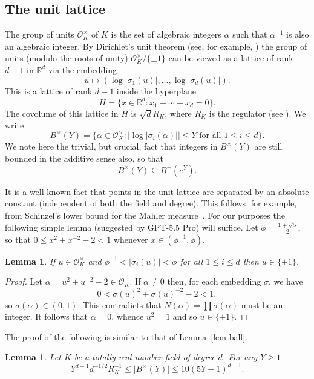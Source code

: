 \documentclass{amsart}
\numberwithin{equation}{section}
\newcommand{\abs}[1]{\mathopen{}\left| #1\mathclose{}\right|}
\newcommand{\bbr}{\mathbb{R}}
\newcommand{\Abs}[1]{\lvert #1\rvert}
\newtheorem{lemma}[theorem]{Lemma}
\begin{document}
\subsection{The unit lattice}
The group of units $\mathcal{O}_K^\times$ of $K$ is the set of algebraic integers $\alpha$ such that $\alpha^{-1}$ is also an algebraic integer. By Dirichlet's unit theorem (see, for example, \cite[Chapter 1.7]{Ne99}) the group of units (modulo the roots of unity) $\mathcal{O}_K^\times/\{\pm 1\}$ can be viewed as a lattice of rank $d-1$ in $\bbr^{d}$ via the embedding
\[u\mapsto (\log \abs{\sigma_1(u)},\ldots,\log \abs{\sigma_d(u)}).\]
This is a lattice of rank $d-1$ inside the hyperplane
\[H=\{ x\in \bbr^d : x_1+\cdots+x_d=0\}.\]
The covolume of this lattice in $H$ is $\sqrt{d}R_K$, where $R_K$ is the regulator (see \cite[Chapter 1, Proposition 7.5]{Ne99}). We write 
\[B^\times(Y) = \{ \alpha \in \mathcal{O}_K^\times : \abs{\log\abs{\sigma_i(\alpha)}}\leq Y\textrm{ for all }1\leq i\leq d\}.\]
We note here the trivial, but crucial, fact that integers in $B^\times(Y)$ are still bounded in the additive sense also, so that
\[B^\times(Y)\subseteq B^+(e^Y).\]

It is a well-known fact that points in the unit lattice are separated by an absolute constant (independent of both the field and degree). This follows, for example, from  Schinzel's lower bound for the Mahler measure~\cite[Theorem 2]{Schinzel1973}. For our purposes the following simple lemma (suggested by GPT-5.5 Pro) will suffice. Let $\phi=\frac{1+\sqrt{5}}{2}$, so that $0\leq x^2+x^{-2}-2<1$ whenever $x\in (\phi^{-1},\phi)$.
\begin{lemma}\label{lem-unitsep}
If $u\in \mathcal{O}_K^\times$ and $\phi^{-1}< \Abs{\sigma_i(u)}<\phi$ for all $1\leq i\leq d$ then $u\in\{\pm 1\}$. 
\end{lemma}
\begin{proof}
Let $\alpha=u^2+u^{-2}-2\in \mathcal{O}_K$. If $\alpha \neq 0$ then, for each embedding $\sigma$, we have
\[0<\sigma(u)^2+\sigma(u)^{-2}-2<1,\]
so $\sigma(\alpha)\in (0,1)$. This contradicts that $N(\alpha)=\prod \sigma(\alpha)$ must be an integer. It follows that $\alpha=0$, whence $u^2=1$ and so $u\in \{\pm 1\}$. 
\end{proof}

The proof of the following is similar to that of Lemma~\ref{lem-ball}.
\begin{lemma}\label{lem-ball-mult}
Let $K$ be a totally real number field of degree $d$. For any $Y\geq 1$
\[Y^{d-1}d^{-1/2}R_K^{-1}\leq \Abs{B^\times(Y)}\leq 10(5Y+1)^{d-1}.\] 
\end{lemma}
\end{document}
